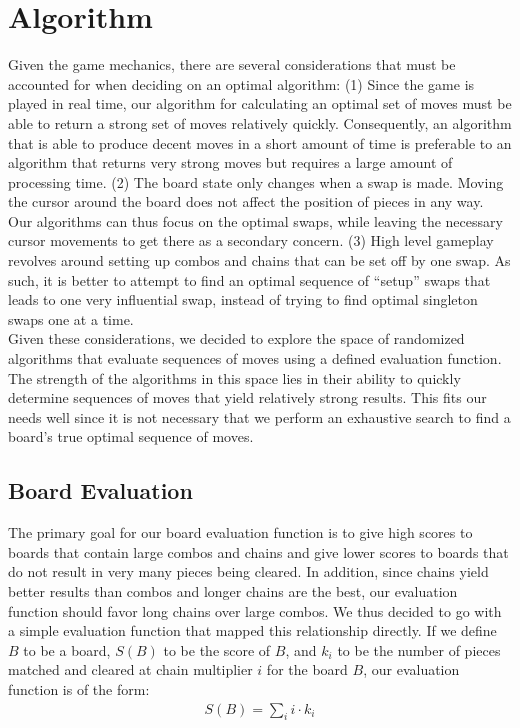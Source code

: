\documentclass[10pt, final]{article}
\newcommand{\br}[1][.75]{\ \\[#1\baselineskip]}
\begin{document}
\section{Algorithm}
Given the game mechanics, there are several considerations that must be accounted for when deciding on an optimal algorithm:
(1) Since the game is played in real time, our algorithm for calculating an optimal set of moves must be able to return a strong set of moves relatively quickly. Consequently, an algorithm that is able to produce decent moves in a short amount of time is preferable to an algorithm that returns very strong moves but requires a large amount of processing time.
(2) The board state only changes when a swap is made. Moving the cursor around the board does not affect the position of pieces in any way. Our algorithms can thus focus on the optimal swaps, while leaving the necessary cursor movements to get there as a secondary concern.
(3) High level gameplay revolves around setting up combos and chains that can be set off by one swap. As such, it is better to attempt to find an optimal sequence of ``setup'' swaps that leads to one very influential swap, instead of trying to find optimal singleton swaps one at a time. \br
Given these considerations, we decided to explore the space of randomized algorithms that evaluate sequences of moves using a defined evaluation function. The strength of the algorithms in this space lies in their ability to quickly determine sequences of moves that yield relatively strong results. This fits our needs well since it is not necessary that we perform an exhaustive search to find a board's true optimal sequence of moves.
\subsection{Board Evaluation}
The primary goal for our board evaluation function is to give high scores to boards that contain large combos and chains and give lower scores to boards that do not result in very many pieces being cleared. In addition, since chains yield better results than combos and longer chains are the best, our evaluation function should favor long chains over large combos. We thus decided to go with a simple evaluation function that mapped this relationship directly. If we define $B$ to be a board, $S(B)$ to be the score of $B$, and $k_i$ to be the number of pieces matched and cleared at chain multiplier $i$ for the board $B$, our evaluation function is of the form:
\begin{align*}
S(B) = \sum_{i}i \cdot k_i
\end{align*}
\end{document}
